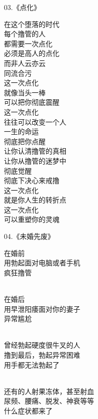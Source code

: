 \documentclass{ctexart}
\begin{document}
\begin{multicols}{2}
    \begin{center}
        03.《点化》\it

        在这个堕落的时代 \\ 每个撸管的人 \\ 都需要一次点化 \\ 必须是高人的点化 \\ 而非人云亦云 \\ 同流合污 \\ 这一次点化 \\ 就像当头一棒 \\ 可以把你彻底震醒 \\ 这一次点化 \\ 往往可以改变一个人 \\ 一生的命运 \\ 彻底把你点醒 \\ 让你认清撸管的真相 \\ 让你从撸管的迷梦中 \\ 彻底觉醒 \\ 彻底下决心来戒撸 \\ 这一次点化 \\ 就是你人生的转折点 \\ 这一次点化 \\ 可以重塑你的灵魂
    \end{center}

    \begin{center}
        04.《未婚先废》\it

        在婚前 \\ 用勃起面对电脑或者手机 \\ 疯狂撸管

        ~\\

        在婚后 \\ 用早泄阳痿面对你的妻子 \\ 异常尴尬

        ~\\

        曾经勃起硬度很牛叉的人 \\ 撸到最后，勃起异常困难 \\ 用手都无法勃起了

        ~\\

        还有的人射果冻体，甚至射血 \\ 尿频、腰痛、脱发、神衰等等 \\ 什么症状都来了

        ~\\


\end{center}
\end{multicols}
\end{document}
